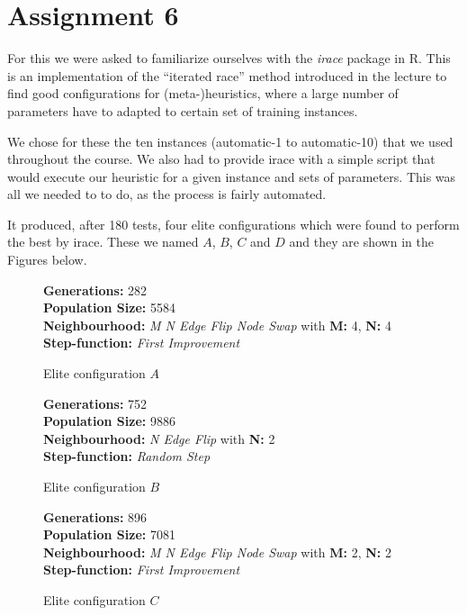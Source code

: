 \documentclass [11pt]{article}
\begin{document}
\section{Assignment 6}


For this we were asked to familiarize ourselves with the \emph{irace} package in R. This is an implementation of the ``iterated race'' method introduced in the lecture to find good configurations for (meta-)heuristics, where a large number of parameters have to adapted to certain set of training instances. 

We chose for these the ten instances (automatic-1 to automatic-10) that we used throughout the course. We also had to provide irace with a simple script that would execute our heuristic for a given instance and sets of parameters. This was all we needed to to do, as the process is fairly automated. 

It produced, after 180 tests, four elite configurations which were found to perform the best by irace. These we  named $A$, $B$, $C$ and $D$ and they are shown in the Figures below. 


\begin{figure}[H]
  \textbf{Generations:} 282 \\
\textbf{Population Size:} 5584 \\
\textbf{Neighbourhood:} \emph{M N Edge Flip Node Swap} with \textbf{M:} 4, \textbf{N:} 4\\
\textbf{Step-function:} \emph{First Improvement} 
\caption{Elite configuration $A$}
\end{figure}


\begin{figure}[H]
  \textbf{Generations:} 752 \\
\textbf{Population Size:} 9886 \\
\textbf{Neighbourhood:} \emph{N Edge Flip } with \textbf{N:} 2\\
\textbf{Step-function:} \emph{Random Step} 
\caption{Elite configuration $B$}
\end{figure}



\begin{figure}[H]
  \textbf{Generations:} 896 \\
\textbf{Population Size:} 7081 \\
\textbf{Neighbourhood:} \emph{M N Edge Flip Node Swap} with \textbf{M:} 2, \textbf{N:} 2\\
\textbf{Step-function:} \emph{First Improvement} 
\caption{Elite configuration $C$}
\end{figure}
\end{document}
